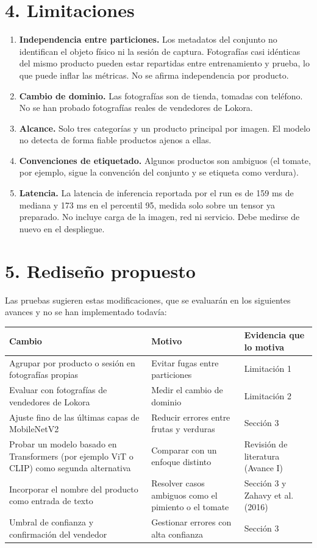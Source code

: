 \documentclass[11pt,a4paper]{article}
\begin{document}
\section*{4. Limitaciones}
\begin{enumerate}[nosep]
\item \textbf{Independencia entre particiones.} Los metadatos del conjunto no identifican el objeto físico ni la sesión de captura. Fotografías casi idénticas del mismo producto pueden estar repartidas entre entrenamiento y prueba, lo que puede inflar las métricas. No se afirma independencia por producto.
\item \textbf{Cambio de dominio.} Las fotografías son de tienda, tomadas con teléfono. No se han probado fotografías reales de vendedores de Lokora.
\item \textbf{Alcance.} Solo tres categorías y un producto principal por imagen. El modelo no detecta de forma fiable productos ajenos a ellas.
\item \textbf{Convenciones de etiquetado.} Algunos productos son ambiguos (el tomate, por ejemplo, sigue la convención del conjunto y se etiqueta como verdura).
\item \textbf{Latencia.} La latencia de inferencia reportada por el run es de 159 ms de mediana y 173 ms en el percentil 95, medida solo sobre un tensor ya preparado. No incluye carga de la imagen, red ni servicio. Debe medirse de nuevo en el despliegue.
\end{enumerate}
\section*{5. Rediseño propuesto}
\noindent Las pruebas sugieren estas modificaciones, que se evaluarán en los siguientes avances y no se han implementado todavía:\par
\begin{center}\small
\begin{tabularx}{\textwidth}{XXX}
\toprule
\textbf{Cambio} & \textbf{Motivo} & \textbf{Evidencia que lo motiva} \\
\midrule
Agrupar por producto o sesión en fotografías propias & Evitar fugas entre particiones & Limitación 1 \\
Evaluar con fotografías de vendedores de Lokora & Medir el cambio de dominio & Limitación 2 \\
Ajuste fino de las últimas capas de MobileNetV2 & Reducir errores entre frutas y verduras & Sección 3 \\
Probar un modelo basado en Transformers (por ejemplo ViT o CLIP) como segunda alternativa & Comparar con un enfoque distinto & Revisión de literatura (Avance I) \\
Incorporar el nombre del producto como entrada de texto & Resolver casos ambiguos como el pimiento o el tomate & Sección 3 y Zahavy et al. (2016) \\
Umbral de confianza y confirmación del vendedor & Gestionar errores con alta confianza & Sección 3 \\
\bottomrule
\end{tabularx}
\end{center}
\end{document}
